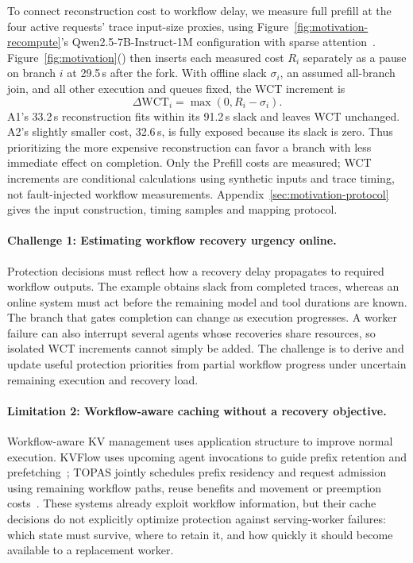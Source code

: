 To connect reconstruction cost to workflow delay, we measure full
prefill at the four active requests' trace input-size proxies, using
Figure~\ref{fig:motivation-recompute}'s Qwen2.5-7B-Instruct-1M
configuration with sparse attention~\cite{qwen2025qwen25oneM,jiang2024minference}.
Figure~\ref{fig:motivation}()
then inserts each measured cost $R_i$ separately as a pause on branch
$i$ at 29.5\,s after the fork. With offline slack $\sigma_i$, an assumed
all-branch join, and all other execution and queues fixed, the WCT
increment is
\[
  \Delta\mathrm{WCT}_i=\max(0,R_i-\sigma_i).
\]
A1's 33.2\,s reconstruction fits within its 91.2\,s slack and leaves WCT
unchanged. A2's slightly smaller cost, 32.6\,s, is fully exposed because
its slack is zero. Thus prioritizing the more expensive reconstruction
can favor a branch with less immediate effect on completion.
Only the Prefill costs are measured; WCT increments are conditional
calculations using synthetic inputs and trace timing, not fault-injected
workflow measurements. Appendix~\ref{sec:motivation-protocol} gives the
input construction, timing samples and mapping protocol.

\paragraph{Challenge 1: Estimating workflow recovery urgency online.}
Protection decisions must reflect how a recovery delay propagates to
required workflow outputs. The example obtains slack from completed
traces, whereas an online system must act before the remaining model
and tool durations are known. The branch that gates completion can
change as execution progresses. A worker failure can also interrupt
several agents whose recoveries share resources, so isolated WCT
increments cannot simply be added. The challenge is to derive and
update useful protection priorities from partial workflow progress
under uncertain remaining execution and recovery load.

\paragraph{Limitation 2: Workflow-aware caching without a recovery objective.}
Workflow-aware KV management uses application structure to improve
normal execution. KVFlow uses upcoming agent invocations to guide prefix
retention and prefetching~\cite{pan2025kvflow}; TOPAS jointly schedules
prefix residency and request admission using remaining workflow paths,
reuse benefits and movement or preemption costs~\cite{ni2026topas}.
These systems already exploit workflow information, but their cache
decisions do not explicitly optimize protection against serving-worker
failures: which state must survive, where to retain it, and how quickly
it should become available to a replacement worker.

